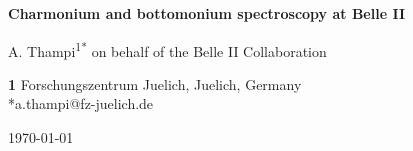 \documentclass[border=2mm]{article}
\newcommand*{\doi}[1]{\href{http://dx.doi.org/#1}{doi: #1}}
\begin{document}
\begin{center}{\Large \textbf{
Charmonium and bottomonium spectroscopy at Belle II\\
}}\end{center}

\begin{center}
  A. Thampi\textsuperscript{1*}
  on behalf of the Belle II Collaboration
\end{center}

\begin{center}
{\bf 1} Forschungszentrum Juelich, Juelich, Germany
\\
*a.thampi@fz-juelich.de
\end{center}

\begin{center}
\today
\end{center}


\end{document}
